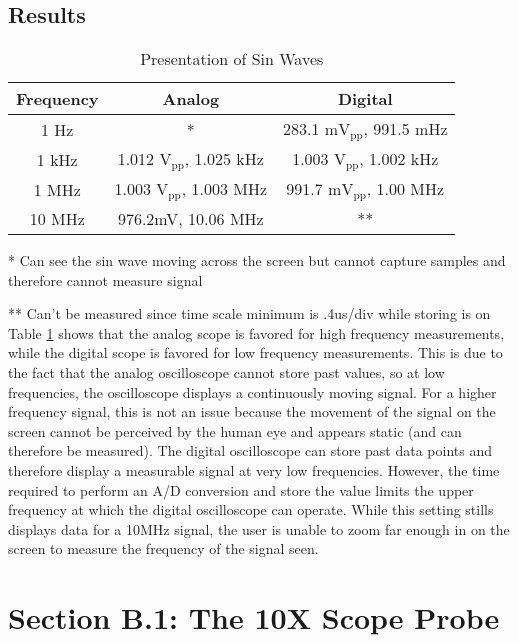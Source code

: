 \documentclass[12pt,letterpaper]{report}
\begin{document}
\subsection*{Results}
\begin{table}[ht]
\caption{Presentation of Sin Waves} %
\centering 
    \begin{tabular}{| c | c | c |}
    \hline  
    Frequency & Analog & Digital \\
    \hline
    1 Hz & * & 283.1 m$\text{V}_{\text{pp}}$, 991.5 mHz \\
    1 kHz & 1.012 $\text{V}_{\text{pp}}$, 1.025 kHz & 1.003 $\text{V}_{\text{pp}}$, 1.002 kHz \\
    1 MHz & 1.003 $\text{V}_{\text{pp}}$, 1.003 MHz & 991.7 m$\text{V}_{\text{pp}}$, 1.00 MHz \\
    10 MHz & 976.2mV, 10.06 MHz & ** \\
    \hline
    \end{tabular}
    \label{table:SinWave}
\end{table}
* Can see the sin wave moving across the screen but cannot capture samples and therefore cannot measure signal

** Can't be measured since time scale minimum is .4us/div while storing is on
\\[.1in]
Table \ref{table:SinWave} shows that the analog scope is favored for high frequency measurements, while the digital scope is favored for low frequency measurements. This is due to the fact that the analog oscilloscope cannot store past values, so at low frequencies, the oscilloscope displays a continuously moving signal. For a higher frequency signal, this is not an issue because the movement of the signal on the screen cannot be perceived by the human eye and appears static (and can therefore be measured). The digital oscilloscope can store past data points and therefore display a measurable signal at very low frequencies. However, the time required to perform an A/D conversion and store the value limits the upper frequency at which the digital oscilloscope can operate. While this setting stills displays data for a 10MHz signal, the user is unable to zoom far enough in on the screen to measure the frequency of the signal seen.

\section*{Section B.1: The 10X Scope Probe}
\end{document}
